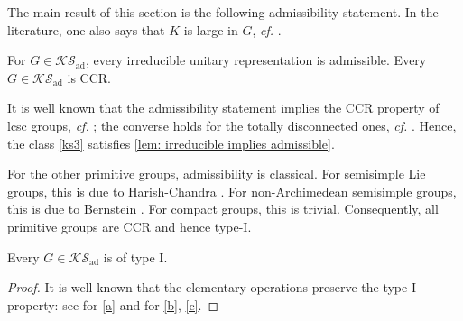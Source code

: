 \documentclass[a4paper, 10pt]{article}
\newcommand{\aks}{\mathcal{KS}_{\mathrm{ad}}}
\begin{document}
The main result of this section is the following admissibility statement. In the literature, one also says that $K$ is large in $G$, \emph{cf.} \cite[Def 6.E.10]{bekka-harpe2020unitary}.
\begin{lemma}\label{lem: irreducible implies admissible}
    For $G\in\aks$, every irreducible unitary representation is admissible.
    Every $G\in\aks$ is CCR.
\end{lemma}

It is well known that the admissibility statement implies the CCR property of lcsc groups, \emph{cf.} \cite[Prop 6.E.11]{bekka-harpe2020unitary}; the converse holds for the totally disconnected ones, \emph{cf.} \cite[Prop 2.14]{gorfine2026a-spectral}. Hence, the class \ref{ks3} satisfies \autoref{lem: irreducible implies admissible}.

For the other primitive groups, admissibility is classical.
For semisimple Lie groups, this is due to Harish-Chandra \cite{harish-chandra1953representations}. For non-Archimedean semisimple groups, this is due to Bernstein \cite{bernshtein1974all-reductive}. 
For compact groups, this is trivial.
Consequently, all primitive groups are CCR and hence type-I.

\begin{lemma}
    Every $G\in \aks$ is of type I.
\end{lemma}
\begin{proof}
    It is well known that the elementary operations preserve the type-I property: see \cite[13.11.7]{dixmier1977c-algebras} for \ref{a} and \cite[4.3.5]{dixmier1977c-algebras} for \ref{b}, \ref{c}.
\end{proof}
\end{document}

